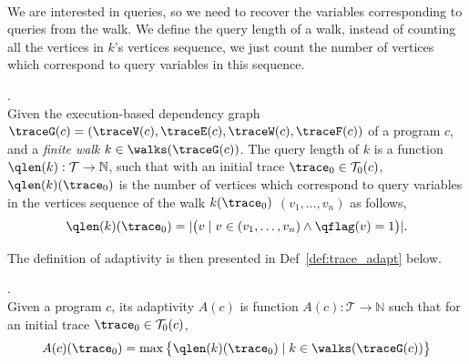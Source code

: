 {\\
We are interested in queries, so we need to recover the 
variables corresponding to queries from the walk. We define the query length of a walk, 
instead of counting all 
the vertices in $k$'s vertices sequence, we just count the number of vertices which correspond to query variables in this sequence.
%
\begin{defn}.
\label{def:qlen}
\\
Given 
the execution-based dependency graph $\traceG({c}) = (\traceV({c}), \traceE({c}), \traceW({c}), \traceF({c}))$ of a program $c$,
 and a \emph{finite walk} 
 $k \in \walks(\traceG(c))$. 
The query length of $k$ is a function $\qlen(k): \mathcal{T} \to \mathbb{N}$, such that with an initial trace  $\trace_0 \in \mathcal{T}_0(c)$, $\qlen(k)(\trace_0)$ is
the number of vertices which correspond to query variables in the vertices sequence of the walk $k(\trace_0)$
$(v_1, \ldots, v_{n})$ as follows, 
\[
  \qlen(k)(\trace_0) = |\big( v \mid v \in (v_1, \ldots, v_{n}) \land \qflag(v) = 1 \big)|.
\]
\end{defn}
}
The definition of adaptivity is then presented in Def~\ref{def:trace_adapt} below.

\begin{defn}
  .
  \label{def:trace_adapt}
  \\
  Given a program ${c}$, 
  its adaptivity $A(c)$ is function 
  $A(c) : \mathcal{T} \to \mathbb{N}$ such that for an
  initial trace $\trace_0 \in \mathcal{T}_0(c)$, 
 $$
  A(c)(\trace_0) = \max \big 
  \{ \qlen(k)(\trace_0) \mid k \in \walks(\traceG(c)) \big \} $$
  \end{defn}



